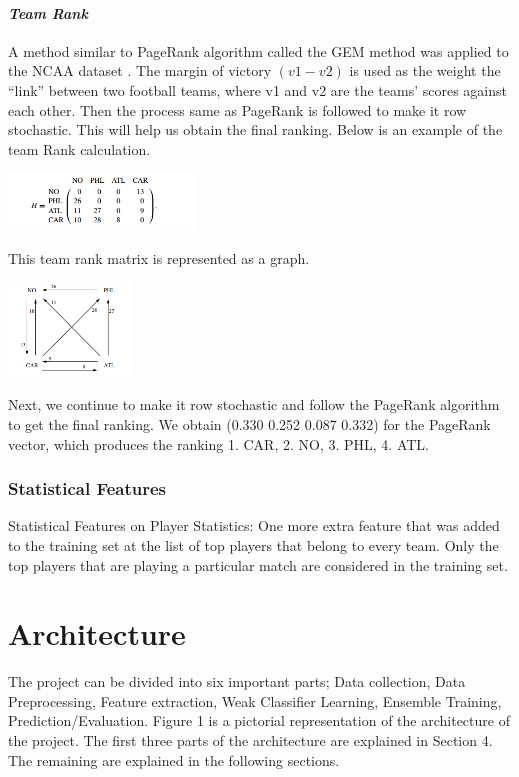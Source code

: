 \documentclass{article}
\begin{document}
\begin{multicols}{2}
	
\paragraph{\textit{Team Rank}}
A method similar to PageRank algorithm called the GEM method was applied to the NCAA dataset \cite{3}.  The margin of victory $(v1-v2)$ is used as the weight the “link” between two football teams, where v1 and v2 are the teams’ scores against each other. Then the process same as PageRank is followed to make it row stochastic. This will help us obtain the final ranking. Below is an example of the team Rank calculation.
	
	\begin{center}
	  \includegraphics[height=15mm]{images/TeamRankMatrix.png}
	\end{center}
	This team rank matrix is represented as a graph.
	\begin{center}
	  \includegraphics[height=25mm]{images/TeamRankGraph.png}
	\end{center}
Next, we continue to make it row stochastic and follow the PageRank algorithm to get the final ranking. We obtain (0.330 0.252 0.087 0.332) for the PageRank vector, which produces the ranking 1. CAR, 2. NO, 3. PHL, 4. ATL.

\subsubsection{Statistical Features}
	Statistical Features on Player Statistics: One more extra feature that was added to the training set at the list of top players that belong to every team. Only the top players that are playing a particular match are considered in the training set.	
	
	\section{Architecture}
		The project can be divided into six important parts; Data collection, Data Preprocessing, Feature extraction, Weak Classifier Learning, Ensemble Training, Prediction/Evaluation. Figure 1 is a pictorial representation of the architecture of the project. The first three parts of the architecture are explained in Section 4. The remaining are explained in the following sections.
	

\end{multicols}
\end{document}
